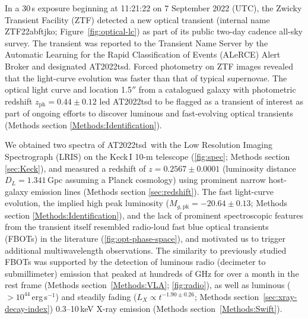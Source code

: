 \documentclass{nature_plusfigure}
\newcommand{\at}{AT2022tsd}
\begin{document}
In a 30\,s exposure beginning at 11:21:22 on 7 September 2022 (UTC), the Zwicky Transient Facility (ZTF\cite{Graham2019,Bellm2019}) detected a new optical transient (internal name ZTF22abftjko; Figure~\ref{fig:optical-lc}) as part of its public two-day cadence all-sky survey.
The transient was reported\cite{Munoz-Arancibia2022} to the Transient Name Server by the Automatic Learning for the Rapid Classification of Events (ALeRCE) Alert Broker\cite{Forster2021} and designated AT2022tsd.
Forced photometry on ZTF images\cite{Masci2019} revealed that the light-curve evolution was faster than that of typical supernovae.
The optical light curve and location 1.5$''$ from a catalogued\cite{Beck2021} galaxy with photometric redshift $z_\mathrm{ph}=0.44\pm0.12$ led AT2022tsd to be flagged as a transient of interest as part of ongoing efforts to discover luminous and fast-evolving optical transients (Methods section \ref{Methods:Identification}).

We obtained two spectra of \at\ with the Low Resolution Imaging Spectrograph (LRIS\cite{Oke1995}) on the Keck\,I 10-m telescope (\ref{fig:spec}; Methods section \ref{sec:Keck}), and measured\cite{Ho2022_Astronote_Keck} a redshift of $z=0.2567\pm0.0001$ (luminosity distance $D_L=1.341\,$Gpc assuming a Planck cosmology\cite{Planck2020}) using prominent narrow host-galaxy emission lines (Methods section \ref{sec:redshift}). 
The fast light-curve evolution, the implied high peak luminosity ($M_{g,\mathrm{pk}}=-20.64\pm0.13$; Methods section \ref{Methods:Identification}), and the lack of prominent spectroscopic features from the transient itself resembled radio-loud fast blue optical transients (FBOTs) in the literature\cite{Prentice2018,Ho2020_Koala,Perley2019,Perley2021,Yao2022} (\ref{fig:opt-phase-space}), and motivated us to trigger additional multiwavelength observations.
The similarity to previously studied FBOTs was supported by the detection of luminous radio (decimeter\cite{Ho2022Astronote_radio} to submillimeter) emission that peaked at hundreds of GHz for over a month in the rest frame (Methods section~\ref{Methods:VLA}; \ref{fig:radio}),
as well as luminous ($>10^{44}\,$erg\,s$^{-1}$) and steadily fading ($L_X\propto t^{-1.90\pm0.26}$; Methods section~\ref{sec:xray-decay-index}) 0.3--10\,keV X-ray emission\cite{Schulze2022Astronote_xray} (Methods section~\ref{Methods:Swift}).
\end{document}
